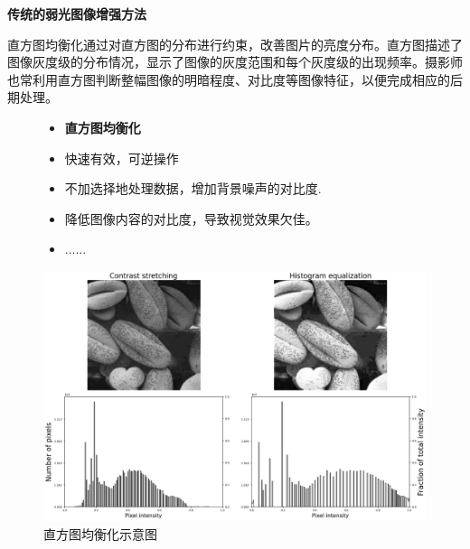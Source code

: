 \documentclass[CJK,aspectratio=169]{beamer}  %
\begin{document}
	\begin{frame}
		{ \yahei \textbf{传统的弱光图像增强方法}}
		
		{ \yahei 直方图均衡化通过对直方图的分布进行约束，改善图片的亮度分布。直方图描述了图像灰度级的分布情况，显示了图像的灰度范围和每个灰度级的出现频率。摄影师也常利用直方图判断整幅图像的明暗程度、对比度等图像特征，以便完成相应的后期处理。}
		
		\begin{figure}
			\centering			
			\begin{minipage}{.4\columnwidth}
				\begin{itemize}
					\item {} \yahei \textbf{直方图均衡化}
					
					\item[\checkmark]
					 \yahei 快速有效，可逆操作				
					
					\item[\checkmark]
					 \yahei 不加选择地处理数据，增加背景噪声的对比度.
				
					\item[\checkmark]
					 \yahei 降低图像内容的对比度，导致视觉效果欠佳。
					
					\item[\checkmark]
					 \yahei ......
					
				\end{itemize}
			\end{minipage}
			\begin{minipage}{.55\columnwidth}
				\setlength{\abovecaptionskip}{-0.05cm}
				\centering 
				\includegraphics[width=\columnwidth]{picture/LLIE/HE/Histogram equalization}
				\caption{
					\label{fig: Histogram equalization} 
					\tiny 直方图均衡化示意图
				}
			\end{minipage}
		\end{figure}
		
	\end{frame}
	
\end{document}
